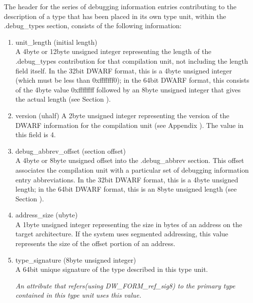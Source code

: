 The header for the series of debugging information entries
contributing to the description of a type that has been
placed in its own type unit, within the .debug\_types section,
consists of the following information:

\begin{enumerate}[1.]

\item unit\_length (initial length) \\
A 4\dash byte or 12\dash byte unsigned integer representing the length
of the .debug\_types contribution for that compilation unit,
not including the length field itself. In the 32\dash bit DWARF
format, this is a 4\dash byte unsigned integer (which must be
less than 0xfffffff0); in the 64\dash bit DWARF format, this
consists of the 4\dash byte value 0xffffffff followed by an 
8\dash byte unsigned integer that gives the actual length
(see Section ).

\item  version (uhalf)
A 2\dash byte unsigned integer representing the version of the
DWARF information for the compilation unit 
(see Appendix ). 
The value in this field is 4.

\item debug\_abbrev\_offset (section offset) \\
A 4\dash byte or 8\dash byte unsigned offset into the .debug\_abbrev
section. This offset associates the compilation unit with a
particular set of debugging information entry abbreviations. In
the 32\dash bit DWARF format, this is a 4\dash byte unsigned length;
in the 64\dash bit DWARF format, this is an 8\dash byte unsigned length
(see Section ).

\item address\_size (ubyte) \\
A 1\dash byte unsigned integer representing the size in bytes of
an address on the target architecture. If the system uses
segmented addressing, this value represents the size of the
offset portion of an address.


\item type\_signature (8\dash byte unsigned integer) \\
A 64\dash bit unique signature of the type described in this type
unit.  

\textit{An attribute that refers(using DW\_FORM\_ref\_sig8) to
the primary type contained in this type unit uses this value.}



\end{enumerate}
